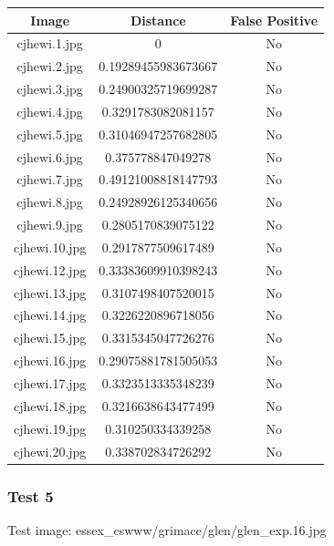 \documentclass[12pt]{article}
\begin{document}
\begin{center}
\begin{tabular}{ccc}
Image & Distance & False Positive \\
\hline
cjhewi.1.jpg & 0 & No \\
cjhewi.2.jpg & 0.19289455983673667 & No \\
cjhewi.3.jpg & 0.24900325719699287 & No \\
cjhewi.4.jpg & 0.3291783082081157 & No \\
cjhewi.5.jpg & 0.31046947257682805 & No \\
cjhewi.6.jpg & 0.375778847049278 & No \\
cjhewi.7.jpg & 0.49121008818147793 & No \\
cjhewi.8.jpg & 0.24928926125340656 & No \\
cjhewi.9.jpg & 0.2805170839075122 & No \\
cjhewi.10.jpg & 0.2917877509617489 & No \\
cjhewi.12.jpg & 0.33383609910398243 & No \\
cjhewi.13.jpg & 0.3107498407520015 & No \\
cjhewi.14.jpg & 0.3226220896718056 & No \\
cjhewi.15.jpg & 0.3315345047726276 & No \\
cjhewi.16.jpg & 0.29075881781505053 & No \\
cjhewi.17.jpg & 0.3323513335348239 & No \\
cjhewi.18.jpg & 0.3216638643477499 & No \\
cjhewi.19.jpg & 0.310250334339258 & No \\
cjhewi.20.jpg & 0.338702834726292 & No \\
\end{tabular}
\end{center}

\newpage
\subsubsection{Test 5}
Test image: essex\_cswww/grimace/glen/glen\_exp.16.jpg
\end{document}
